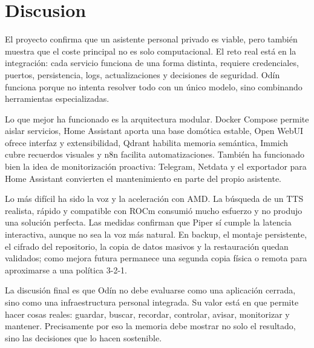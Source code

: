 
\section{Discusion}
El proyecto confirma que un asistente personal privado es viable, pero también muestra que el coste principal no es solo computacional. El reto real está en la integración: cada servicio funciona de una forma distinta, requiere credenciales, puertos, persistencia, logs, actualizaciones y decisiones de seguridad. Odín funciona porque no intenta resolver todo con un único modelo, sino combinando herramientas especializadas.

Lo que mejor ha funcionado es la arquitectura modular. Docker Compose permite aislar servicios, Home Assistant aporta una base domótica estable, Open WebUI ofrece interfaz y extensibilidad, Qdrant habilita memoria semántica, Immich cubre recuerdos visuales y n8n facilita automatizaciones. También ha funcionado bien la idea de monitorización proactiva: Telegram, Netdata y el exportador para Home Assistant convierten el mantenimiento en parte del propio asistente.

Lo más difícil ha sido la voz y la aceleración con AMD. La búsqueda de un TTS realista, rápido y compatible con ROCm consumió mucho esfuerzo y no produjo una solución perfecta. Las medidas confirman que Piper sí cumple la latencia interactiva, aunque no sea la voz más natural. En backup, el montaje persistente, el cifrado del repositorio, la copia de datos masivos y la restauración quedan validados; como mejora futura permanece una segunda copia física o remota para aproximarse a una política 3-2-1.

La discusión final es que Odín no debe evaluarse como una aplicación cerrada, sino como una infraestructura personal integrada. Su valor está en que permite hacer cosas reales: guardar, buscar, recordar, controlar, avisar, monitorizar y mantener. Precisamente por eso la memoria debe mostrar no solo el resultado, sino las decisiones que lo hacen sostenible.
